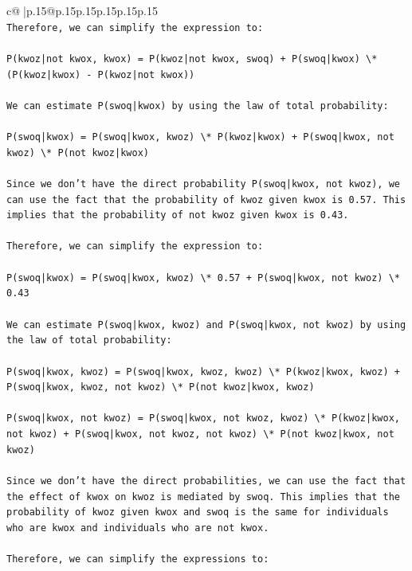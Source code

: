 \documentclass{article}
\begin{document}
{\begin{supertabular}{c@{$\;$}|p{.15\linewidth}@{}p{.15\linewidth}p{.15\linewidth}p{.15\linewidth}p{.15\linewidth}p{.15\linewidth}}
{{{\\ 
\texttt{Therefore, we can simplify the expression to:} \\
\\ 
\texttt{P(kwoz|not kwox, kwox) = P(kwoz|not kwox, swoq) + P(swoq|kwox) \textbackslash{}* (P(kwoz|kwox) {-} P(kwoz|not kwox))} \\
\\ 
\texttt{We can estimate P(swoq|kwox) by using the law of total probability:} \\
\\ 
\texttt{P(swoq|kwox) = P(swoq|kwox, kwoz) \textbackslash{}* P(kwoz|kwox) + P(swoq|kwox, not kwoz) \textbackslash{}* P(not kwoz|kwox)} \\
\\ 
\texttt{Since we don't have the direct probability P(swoq|kwox, not kwoz), we can use the fact that the probability of kwoz given kwox is 0.57. This implies that the probability of not kwoz given kwox is 0.43.} \\
\\ 
\texttt{Therefore, we can simplify the expression to:} \\
\\ 
\texttt{P(swoq|kwox) = P(swoq|kwox, kwoz) \textbackslash{}* 0.57 + P(swoq|kwox, not kwoz) \textbackslash{}* 0.43} \\
\\ 
\texttt{We can estimate P(swoq|kwox, kwoz) and P(swoq|kwox, not kwoz) by using the law of total probability:} \\
\\ 
\texttt{P(swoq|kwox, kwoz) = P(swoq|kwox, kwoz, kwoz) \textbackslash{}* P(kwoz|kwox, kwoz) + P(swoq|kwox, kwoz, not kwoz) \textbackslash{}* P(not kwoz|kwox, kwoz)} \\
\\ 
\texttt{P(swoq|kwox, not kwoz) = P(swoq|kwox, not kwoz, kwoz) \textbackslash{}* P(kwoz|kwox, not kwoz) + P(swoq|kwox, not kwoz, not kwoz) \textbackslash{}* P(not kwoz|kwox, not kwoz)} \\
\\ 
\texttt{Since we don't have the direct probabilities, we can use the fact that the effect of kwox on kwoz is mediated by swoq. This implies that the probability of kwoz given kwox and swoq is the same for individuals who are kwox and individuals who are not kwox.} \\
\\ 
\texttt{Therefore, we can simplify the expressions to:} \\
\\ 
}}}
\end{supertabular}}
\end{document}
